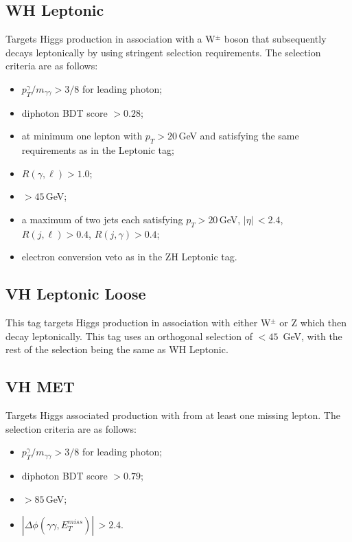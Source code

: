 \subsection{WH Leptonic}
Targets Higgs production in association with a W$^{\pm}$ boson that subsequently decays leptonically by using stringent selection requirements. The selection criteria are as follows:
\begin{itemize}[noitemsep]
    \item $p^{\gamma}_{T}/m_{\gamma\gamma} > 3/8$ for leading photon;
    \item diphoton BDT score $> 0.28$;
    \item at minimum one lepton with $p_T > 20$\,GeV and satisfying the same requirements as in the \ttH Leptonic tag;
    \item $R(\gamma,\ell) > 1.0$;
    \item \MET$> 45$\,GeV;
    \item a maximum of two jets each satisfying $p_T > 20$\,GeV, $|\eta|\, < 2.4$, $R(j,\ell) > 0.4$, $R(j,\gamma) > 0.4$;
    \item electron conversion veto as in the ZH Leptonic tag.
\end{itemize}



\subsection{VH Leptonic Loose}
This tag targets Higgs production in association with either W$^{\pm}$ or Z which then decay leptonically. 
This tag uses an orthogonal \MET selection of \MET$ < 45$\, GeV, with the rest of the selection being the same as WH Leptonic.

\subsection{VH MET}
Targets Higgs associated production with \MET from at least one missing lepton. The selection criteria are as follows:
\begin{itemize}[noitemsep]
    \item $p^{\gamma}_{T}/m_{\gamma\gamma} > 3/8$ for leading photon;
    \item diphoton BDT score $> 0.79$;
    \item \MET$> 85$\,GeV;
    \item $|\Delta\phi(\gamma\gamma,E_{T}^{miss})|\, > 2.4$.
\end{itemize}


